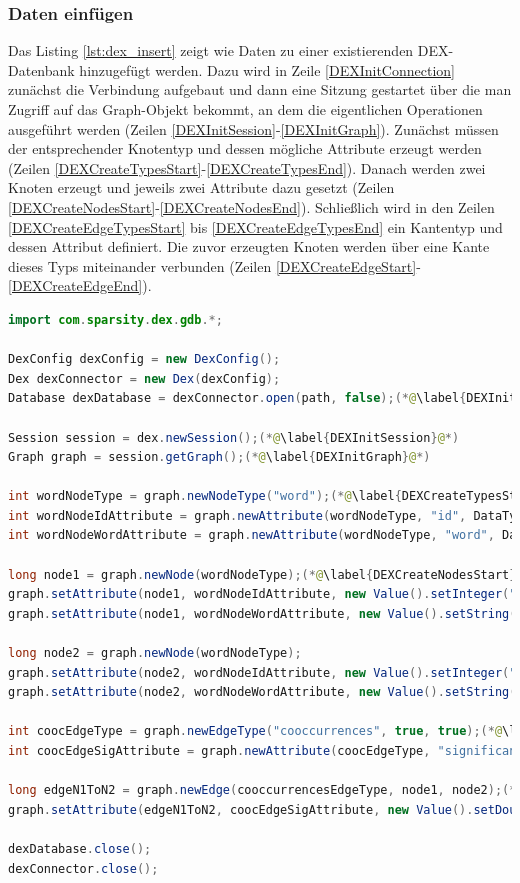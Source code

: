 \documentclass[11pt, a4paper, oneside]{article} %
\begin{document}
\subsubsection{Daten einfügen}
Das Listing \ref{lst:dex_insert} zeigt wie Daten zu einer existierenden DEX-Datenbank hinzugefügt werden. Dazu wird in Zeile \ref{DEXInitConnection} zunächst die Verbindung aufgebaut und dann eine Sitzung gestartet über die man Zugriff auf das Graph-Objekt bekommt, an dem die eigentlichen Operationen ausgeführt werden (Zeilen \ref{DEXInitSession}-\ref{DEXInitGraph}). Zunächst müssen der entsprechender Knotentyp und dessen mögliche Attribute erzeugt werden (Zeilen \ref{DEXCreateTypesStart}-\ref{DEXCreateTypesEnd}). Danach werden zwei Knoten erzeugt und jeweils zwei Attribute dazu gesetzt (Zeilen \ref{DEXCreateNodesStart}-\ref{DEXCreateNodesEnd}). Schließlich wird in den Zeilen \ref{DEXCreateEdgeTypesStart} bis \ref{DEXCreateEdgeTypesEnd} ein Kantentyp und dessen Attribut definiert. Die zuvor erzeugten Knoten werden über eine Kante dieses Typs miteinander verbunden (Zeilen \ref{DEXCreateEdgeStart}-\ref{DEXCreateEdgeEnd}).

\begin{lstlisting}[caption={DEX - Daten einfügen},label={lst:dex_insert},language=Java]
import com.sparsity.dex.gdb.*;

DexConfig dexConfig = new DexConfig();
Dex dexConnector = new Dex(dexConfig);
Database dexDatabase = dexConnector.open(path, false);(*@\label{DEXInitConnection}@*)

Session session = dex.newSession();(*@\label{DEXInitSession}@*)
Graph graph = session.getGraph();(*@\label{DEXInitGraph}@*)

int wordNodeType = graph.newNodeType("word");(*@\label{DEXCreateTypesStart}@*)
int wordNodeIdAttribute = graph.newAttribute(wordNodeType, "id", DataType.Integer, AttributeKind.Indexed);
int wordNodeWordAttribute = graph.newAttribute(wordNodeType, "word", DataType.String, AttributeKind.Basic);(*@\label{DEXCreateTypesEnd}@*)

long node1 = graph.newNode(wordNodeType);(*@\label{DEXCreateNodesStart}@*)
graph.setAttribute(node1, wordNodeIdAttribute, new Value().setInteger("1"));
graph.setAttribute(node1, wordNodeWordAttribute, new Value().setString("Car"));

long node2 = graph.newNode(wordNodeType);
graph.setAttribute(node2, wordNodeIdAttribute, new Value().setInteger("2"));
graph.setAttribute(node2, wordNodeWordAttribute, new Value().setString("Tree"));(*@\label{DEXCreateNodesEnd}@*)

int coocEdgeType = graph.newEdgeType("cooccurrences", true, true);(*@\label{DEXCreateEdgeTypesStart}@*)
int coocEdgeSigAttribute = graph.newAttribute(coocEdgeType, "significance", DataType.Double, AttributeKind.Indexed);(*@\label{DEXCreateEdgeTypesEnd}@*)

long edgeN1ToN2 = graph.newEdge(cooccurrencesEdgeType, node1, node2);(*@\label{DEXCreateEdgeStart}@*)
graph.setAttribute(edgeN1ToN2, coocEdgeSigAttribute, new Value().setDouble(1.5));(*@\label{DEXCreateEdgeEnd}@*)

dexDatabase.close();
dexConnector.close();
\end{lstlisting}
\end{document}
